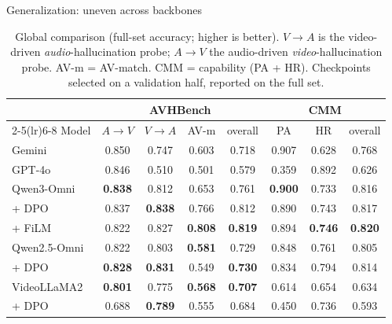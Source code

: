 \documentclass[aspectratio=169,11pt]{beamer}
\begin{document}
\begin{frame}{Generalization: uneven across backbones}
\centering
\begin{table}[tb]\centering\footnotesize
\setlength{\tabcolsep}{4pt}
\caption{Global comparison (full-set accuracy; higher is better). $V\!\to\!A$ is the video-driven \emph{audio}-hallucination probe; $A\!\to\!V$ the audio-driven \emph{video}-hallucination probe. AV-m = AV-match. CMM = capability (PA + HR). Checkpoints selected on a validation half, reported on the full set.}
\label{tab:main}
\begin{tabular}{l cccc ccc}
\toprule
& \multicolumn{4}{c}{AVHBench} & \multicolumn{3}{c}{CMM} \\
\cmidrule(lr){2-5}\cmidrule(lr){6-8}
Model & $A\!\to\!V$ & $V\!\to\!A$ & AV-m & overall & PA & HR & overall \\
\midrule
Gemini    & 0.850 & 0.747 & 0.603 & 0.718 & 0.907 & 0.628 & 0.768 \\
GPT-4o    & 0.846 & 0.510 & 0.501 & 0.579 & 0.359 & 0.892 & 0.626 \\
\midrule
Qwen3-Omni            & \textbf{0.838} & 0.812 & 0.653 & 0.761 & \textbf{0.900} & 0.733 & 0.816 \\
\quad + DPO           & 0.837 & \textbf{0.838} & 0.766 & 0.812 & 0.890 & 0.743 & 0.817 \\
\quad + FiLM          & 0.822 & 0.827 & \textbf{0.808} & \textbf{0.819} & 0.894 & \textbf{0.746} & \textbf{0.820} \\
\midrule
Qwen2.5-Omni          & 0.822 & 0.803 & \textbf{0.581} & 0.729 & 0.848 & 0.761 & 0.805 \\
\quad + DPO           & \textbf{0.828} & \textbf{0.831} & 0.549 & \textbf{0.730} & 0.834 & 0.794 & 0.814 \\
\midrule
VideoLLaMA2           & \textbf{0.801} & 0.775 & \textbf{0.568} & \textbf{0.707} & 0.614 & 0.654 & 0.634 \\
\quad + DPO           & 0.688 & \textbf{0.789} & 0.555 & 0.684 & 0.450 & 0.736 & 0.593 \\
\bottomrule
\end{tabular}
\end{table}
\end{frame}
\end{document}
